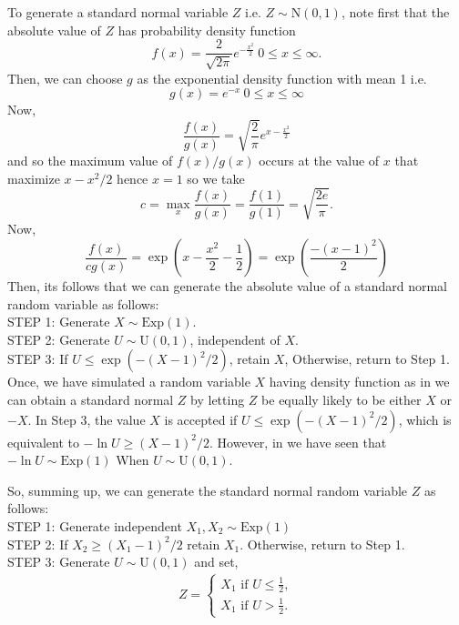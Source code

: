 \begin{example}
	\label{generate normal}
    To generate a standard normal variable $Z$ i.e. $Z\sim \text{N}(0,1)$, note first that the absolute value of  $Z$ has probability density function
	\begin{equation}
		\label{abs std normal}
		f(x) = \frac{2}{\sqrt{2\pi}}e^{- \frac{x^{2}}{2}} \ 0\le x \le \infty.
	\end{equation}
	Then, we can choose $g$ as the exponential density function with mean 1 i.e.
	\[
		g(x) = e^{-x}\ 0\le x\le \infty
	\]
	Now,
	\[
		\frac{f(x)}{g(x)} = \sqrt{\frac{2}{\pi}} e^{x-\frac{x^{2}}{2}}
	\]
	and so the maximum value of $f(x)/g(x)$ occurs at the value of $x$ that maximize $x-x^2 /2$ hence $x=1$ so we take
	\[
		c = \max_x \frac{f(x)}{g(x)} = \frac{f(1)}{g(1)} = \sqrt{\frac{2e}{\pi}}.
	\]
	Now,
	\[
		\frac{f(x)}{cg(x)} = \exp\left( x-\frac{x^2}{2}-\frac{1}{2} \right) = \exp\left( \frac{-(x-1)^2}{2} \right)
	\]
	Then, its follows that we can generate the absolute value of a standard normal random variable as follows: \\
    STEP 1: Generate $X\sim \text{Exp}(1)$. \\
    STEP 2: Generate $U\sim \text{U}(0,1)$, independent of $X$.\\
	STEP 3: If  $U\le \exp\left( -(X-1)^2 /2 \right)$, retain  $X$, Otherwise, return to Step 1.\\

	Once, we have simulated a random variable $X$ having density function as in
	 we can obtain a standard normal $Z$ by letting
	$Z$ be equally likely to be either  $X$ or  $-X$.
	In Step 3, the value $X$ is accepted if  $U\le \exp\left( -(X-1)^2 /2 \right)$, which is equivalent to $- \ln U\ge (X-1)^2 /2$.
    However, in  we have seen that $-\ln{U}\sim \text{Exp}(1)$ When $U\sim \text{U}(0,1)$.

	So, summing up, we can generate the standard normal random variable $Z$ as follows:\\
    STEP 1: Generate independent $X_1, X_2\sim \text{Exp}(1) $\\
	STEP 2: If $X_2\ge (X_1-1)^2 /2$ retain $X_1$. Otherwise, return to Step 1.\\
    STEP 3: Generate $U\sim \text{U}(0,1)$ and set,
	\begin{eqnarray*}
		Z=
		\begin{cases}
			X_1 \text{ if } U\le \frac{1}{2}, \\
			X_1 \text{ if } U> \frac{1}{2}.
		\end{cases}
	\end{eqnarray*}


\end{example}
